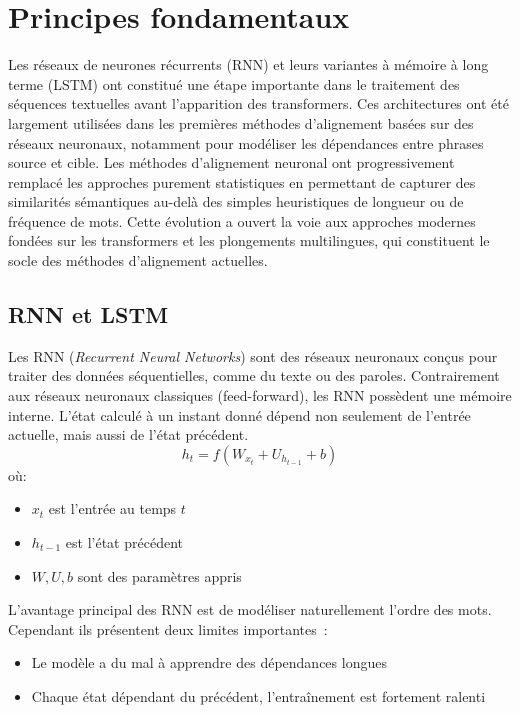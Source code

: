 \section{Principes fondamentaux}

Les réseaux de neurones récurrents (RNN) et leurs variantes à mémoire à long terme (LSTM) ont constitué
une étape importante dans le traitement des séquences textuelles avant l'apparition des \gls{transformers}. Ces architectures
ont été largement utilisées dans les premières méthodes d'alignement basées sur des réseaux neuronaux, notamment
pour modéliser les dépendances entre phrases source et cible. Les méthodes d'alignement neuronal ont progressivement
remplacé les approches purement statistiques en permettant de capturer des similarités sémantiques au-delà des
simples heuristiques de longueur ou de fréquence de mots. Cette évolution a ouvert la voie aux approches modernes
fondées sur les transformers et les plongements multilingues, qui constituent le socle des méthodes d'alignement
actuelles.

\subsection{RNN et LSTM}

Les RNN (\textit{Recurrent Neural Networks}) sont des réseaux neuronaux conçus pour traiter des
données séquentielles, comme du texte ou des paroles.
Contrairement aux réseaux neuronaux classiques (feed-forward), les RNN possèdent une mémoire interne.
L’état calculé à un instant donné dépend non seulement de l’entrée actuelle, mais aussi de l’état précédent.
\[ h_{t}=f(W_{x_{t}}+U_{h_{t-1}}+b) \]
où:
\begin{itemize}
    \item \( x_{t} \) est l'entrée au temps \( t \)
    \item \( h_{t-1} \) est l'état précédent
    \item \( W, U, b \) sont des paramètres appris
\end{itemize}
L'avantage principal des RNN est de modéliser naturellement l’ordre des mots.
Cependant ils présentent deux limites importantes~:
\begin{itemize}
    \item Le modèle a du mal à apprendre des dépendances longues
    \item Chaque état dépendant du précédent, l'entraînement est fortement ralenti
\end{itemize}

